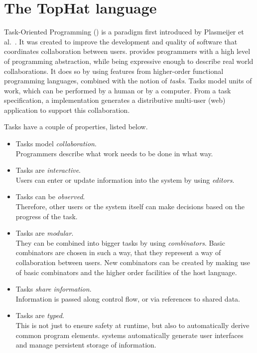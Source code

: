 
\section{The TopHat language}
\label{sec:tophat}

Task-Oriented Programming (\TOP) is a paradigm first introduced by Plasmeijer et al.~\cite{DBLP:conf/ppdp/PlasmeijerLMAK12}.
It was created to improve the development and quality of software that coordinates collaboration between users.
\TOP provides programmers with a high level of programming abstraction,
while being expressive enough to describe real world collaborations.
It does so by using features from higher-order functional programming languages,
combined with the notion of \emph{tasks}.
Tasks model units of work, which can be performed by a human or by a computer.
From a task specification, a \TOP implementation generates a distributive multi-user (web) application to support this collaboration.

Tasks have a couple of properties, listed below.
\begin{itemize}
  \item
    Tasks model \emph{collaboration}.\\
    Programmers describe what work needs to be done in what way.
  \item
    Tasks are \emph{interactive}.\\
    Users can enter or update information into the system by using \emph{editors}.
  \item
    Tasks can be \emph{observed}.\\
    Therefore, other users or the system itself can make decisions based on the progress of the task.
  \item
    Tasks are \emph{modular}.\\
    They can be combined into bigger tasks by using \emph{combinators}.
    Basic combinators are chosen in such a way, that they represent a way of collaboration between users.
    New combinators can be created by making use of basic combinators and the higher order facilities of the host language.
  \item
    Tasks \emph{share information}.\\
    Information is passed along control flow, or via references to shared data.
  \item
    Tasks are \emph{typed}.\\
    This is not just to ensure safety at runtime,
    but also to automatically derive common program elements.
    \TOP systems automatically generate user interfaces and manage persistent storage of information.
\end{itemize}

